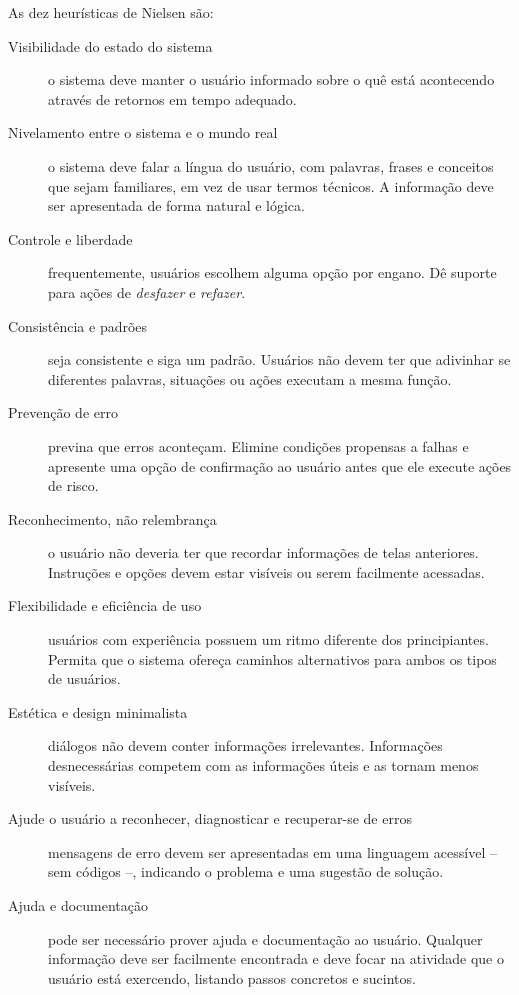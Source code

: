 As dez heurísticas de Nielsen são:
\begin{description}
	\item [Visibilidade do estado do sistema] o sistema deve manter o usuário informado sobre o quê está acontecendo através de retornos em tempo adequado.
	\item [Nivelamento entre o sistema e o mundo real] o sistema deve falar a língua do usuário, com palavras, frases e conceitos que sejam familiares, em vez de usar termos técnicos. A informação deve ser apresentada de forma natural e lógica.
	\item [Controle e liberdade] frequentemente, usuários escolhem alguma opção por engano. Dê suporte para ações de \emph{desfazer} e \emph{refazer}.
	\item [Consistência e padrões] seja consistente e siga um padrão. Usuários não devem ter que adivinhar se diferentes palavras, situações ou ações executam a mesma função.
	\item [Prevenção de erro] previna que erros aconteçam. Elimine condições propensas a falhas e apresente uma opção de confirmação ao usuário antes que ele execute ações de risco.
	\item [Reconhecimento, não relembrança] o usuário não deveria ter que recordar informações de telas anteriores. Instruções e opções devem estar visíveis ou serem facilmente acessadas.
	\item [Flexibilidade e eficiência de uso] usuários com experiência possuem um ritmo diferente dos principiantes. Permita que o sistema ofereça caminhos alternativos para ambos os tipos de usuários.
	\item [Estética e design minimalista] diálogos não devem conter informações irrelevantes. Informações desnecessárias competem com as informações úteis e as tornam menos visíveis.
	\item [Ajude o usuário a reconhecer, diagnosticar e recuperar-se de erros] mensagens de erro devem ser apresentadas em uma linguagem acessível -- sem códigos --, indicando o problema e uma sugestão de solução.
	\item [Ajuda e documentação] pode ser necessário prover ajuda e documentação ao usuário. Qualquer informação deve ser facilmente encontrada e deve focar na atividade que o usuário está exercendo, listando passos concretos e sucintos.
\end{description}

